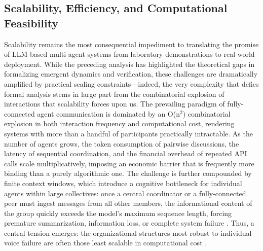 \documentclass[11pt,a4paper]{article}
\begin{document}
\subsection{Scalability, Efficiency, and Computational Feasibility}


Scalability remains the most consequential impediment to translating the promise of LLM-based multi-agent systems from laboratory demonstrations to real-world deployment. While the preceding analysis has highlighted the theoretical gaps in formalizing emergent dynamics and verification, these challenges are dramatically amplified by practical scaling constraints---indeed, the very complexity that defies formal analysis stems in large part from the combinatorial explosion of interactions that scalability forces upon us. The prevailing paradigm of fully-connected agent communication is dominated by an O(n$^{2}$) combinatorial explosion in both interaction frequency and computational cost, rendering systems with more than a handful of participants practically intractable. As the number of agents grows, the token consumption of pairwise discussions, the latency of sequential coordination, and the financial overhead of repeated API calls scale multiplicatively, imposing an economic barrier that is frequently more binding than a purely algorithmic one. The challenge is further compounded by finite context windows, which introduce a cognitive bottleneck for individual agents within large collectives: once a central coordinator or a fully-connected peer must ingest messages from all other members, the informational content of the group quickly exceeds the model's maximum sequence length, forcing premature summarization, information loss, or complete system failure \cite{arxiv:2309.07864v3,arxiv:2409.02977v1}. Thus, a central tension emerges: the organizational structures most robust to individual voice failure are often those least scalable in computational cost \cite{arxiv:1503.07220v2}.
\end{document}
